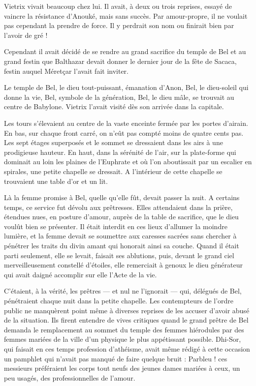 \documentclass[a4paper, 11pt, oneside, polutonikogreek, french]{article}
\begin{document}
Vietrix vivait beaucoup chez lui. Il avait, à deux ou trois reprises, essayé de vaincre la résistance d'Anouké, mais sans succès. Par amour-propre, il ne voulait pas cependant la prendre de force. Il y perdrait son nom ou finirait bien par l'avoir de gré !

Cependant il avait décidé de se rendre au grand sacrifice du temple de Bel et au grand festin que Balthazar devait donner le dernier jour de la fête de Sacaca, festin auquel Méretçar l'avait fait inviter.

\bigskip
\centerline{\EightStarTaper}
\centerline{\EightStarTaper\EightStarTaper}
\bigskip

Le temple de Bel, le dieu tout-puissant, émanation d'Anon, Bel, le dieu-soleil qui donne la vie, Bel, symbole de la génération, Bel, le dieu mâle, se trouvait au centre de Babylone. Vietrix l'avait visité dès son arrivée dans la capitale.

Les tours s'élevaient au centre de la vaste enceinte fermée par les portes d'airain. En bas, sur chaque front carré, on n'eût pas compté moins de quatre cents pas. Les sept étages superposés et le sommet se dressaient dans les airs à une prodigieuse hauteur. En haut, dans la sérénité de l'air, sur la plate-forme qui dominait au loin les plaines de l'Euphrate et où l'on aboutissait par un escalier en spirales, une petite chapelle se dressait. A l'intérieur de cette chapelle se trouvaient une table d'or et un lit.

\bigskip
\centerline{\EightStarTaper}
\centerline{\EightStarTaper\EightStarTaper}
\bigskip

Là la femme promise à Bel, quelle qu'elle fût, devait passer la nuit. A certains temps, ce service fut dévolu aux prêtresses. Elles attendaient dans la prière, étendues nues, en posture d'amour, auprès de la table de sacrifice, que le dieu voulût bien se présenter. Il était interdit en ces lieux d'allumer la moindre lumière, et la femme devait se soumettre aux caresses sacrées sans chercher à pénétrer les traits du divin amant qui honorait ainsi sa couche. Quand il était parti seulement, elle se levait, faisait ses ablutions, puis, devant le grand ciel merveilleusement constellé d'étoiles, elle remerciait à genoux le dieu générateur qui avait daigné accomplir sur elle l'Acte de la vie.

C'étaient, à la vérité, les prêtres --- et nul ne l'ignorait --- qui, délégués de Bel, pénétraient chaque nuit dans la petite chapelle. Les contempteurs de l'ordre public ne manquèrent point même à diverses reprises de les accuser d'avoir abusé de la situation. Ils firent entendre de vives critiques quand le grand prêtre de Bel demanda le remplacement au sommet du temple des femmes hiérodules par des femmes mariées de la ville d'un physique le plus appétissant possible. Dhi-Sor, qui faisait en ces temps profession d'athéisme, avait même rédigé à cette occasion un pamphlet qui n'avait pas manqué de faire quelque bruit : Parbleu ! ces messieurs préféraient les corps tout neufs des jeunes dames mariées à ceux, un peu usagés, des professionnelles de l'amour.
\end{document}
